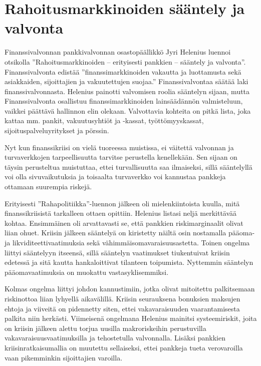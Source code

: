 \documentclass[12pt]{article}
\begin{document}
\newpage
\section{Rahoitusmarkkinoiden sääntely ja valvonta}

Finanssivalvonnan pankkivalvonnan osastopäällikkö Jyri Helenius luennoi otsikolla ''Rahoitusmarkkinoiden -- erityisesti pankkien -- sääntely ja valvonta''. Finanssivalvonta edistää ''finanssimarkkinoiden vakautta ja luottamusta sekä asiakkaiden, sijoittajien ja vakuutettujen suojaa.'' Finanssivalvontaa säätää laki finanssivalvonnasta. Helenius painotti valvomisen roolia sääntelyn sijaan, mutta Finanssivalvonta osallistuu finanssimarkkinoiden lainsäädännön valmisteluun, vaikkei päättävä hallinnon elin olekaan. Valvottavia kohteita on pitkä lista, joka kattaa mm. pankit, vakuutusyhtiöt ja -kassat, työttömyyskassat, sijoituspalveluyritykset ja pörssin.

Nyt kun finanssikriisi on vielä tuoreessa muistissa, ei väitettä valvonnan ja turvaverkkojen tarpeellisuutta tarvitse perustella kenellekään. Sen sijaan on täysin perusteltua muistuttaa, ettei turvallisuutta saa ilmaiseksi, sillä sääntelyllä voi olla sivuvaikutuksia ja toisaalta turvaverkko voi kannustaa pankkeja ottamaan suurempia riskejä.

Erityisesti ''Rahapolitiikka''-luennon jälkeen oli mielenkiintoista kuulla, mitä finanssikriisistä tarkalleen ottaen opittiin. Helenius listasi neljä merkittävää kohtaa. Ensimmäinen oli arvattavasti se, että pankkien riskimarginaalit olivat liian ohuet. Kriisin jälkeen sääntelyä on kiristetty näiltä osin nostamalla pääoma- ja likviditeettivaatimuksia sekä vä\-him\-mäis\-oma\-va\-rai\-suus\-as\-tet\-ta. Toinen ongelma liittyi sääntelyyn itseensä, sillä sääntelyn vaatimukset tiukentuivat kriisin edetessä ja sitä kautta hankaloittivat tilanteen toipumista. Nyttemmin sääntelyn pääomavaatimuksia on muokattu vastasyklisemmiksi.

Kolmas ongelma liittyi johdon kannustimiin, jotka olivat mitoitettu palkitsemaan riskinottoa liian lyhyellä aikavälillä. Kriisin seurauksena bonuksien maksujen ehtoja ja viiveitä on pidennetty siten, ettei vakavaraisuuden vaarantamisesta palkita niin herkästi. Viimeisenä ongelmana Helenius mainitsi systeemiriskit, joita on kriisin jälkeen alettu torjua uusilla makroriskeihin perustuvilla vakavaraisuusvaatimuksilla ja tehostetulla valvonnalla. Lisäksi pankkien kriisinratkaisumallia on muutettu sellaiseksi, ettei pankkeja tueta verovaroilla vaan pikemminkin sijoittajien varoilla.
\end{document}
